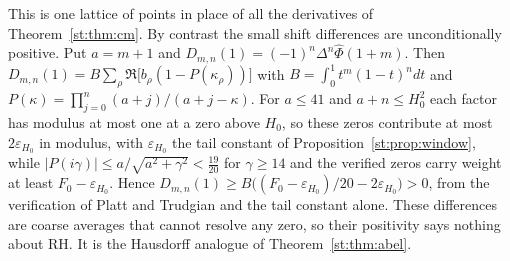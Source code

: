 This is one lattice of points in place of all the derivatives of Theorem~\ref{st:thm:cm}. By contrast the small shift differences are unconditionally positive. Put $a=m+1$ and $D_{m,n}(1)=(-1)^n\Delta^n\hat\Phi(1+m)$. Then $D_{m,n}(1)=B\sum_\rho\Re\big[b_\rho(1-P(\kappa_\rho))\big]$ with $B=\int_0^1t^m(1-t)^ndt$ and $P(\kappa)=\prod_{j=0}^n(a+j)/(a+j-\kappa)$. For $a\le41$ and $a+n\le H_0^2$ each factor has modulus at most one at a zero above $H_0$, so these zeros contribute at most $2\varepsilon_{H_0}$ in modulus, with $\varepsilon_{H_0}$ the tail constant of Proposition~\ref{st:prop:window}, while $|P(i\gamma)|\le a/\sqrt{a^2+\gamma^2}<\tfrac{19}{20}$ for $\gamma\ge14$ and the verified zeros carry weight at least $F_0-\varepsilon_{H_0}$. Hence $D_{m,n}(1)\ge B\big((F_0-\varepsilon_{H_0})/20-2\varepsilon_{H_0}\big)>0$, from the verification of Platt and Trudgian and the tail constant alone. These differences are coarse averages that cannot resolve any zero, so their positivity says nothing about RH. It is the Hausdorff analogue of Theorem~\ref{st:thm:abel}.

